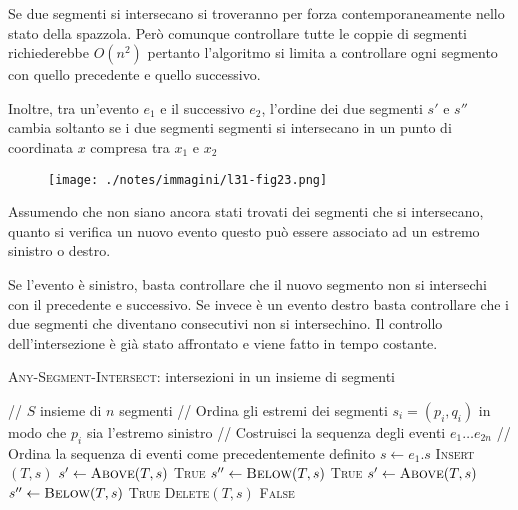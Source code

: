 Se due segmenti si intersecano si troveranno per forza contemporaneamente nello stato della spazzola. 
Però comunque controllare tutte le coppie di segmenti richiederebbe $O(n^{2})$ pertanto l'algoritmo si limita a controllare ogni segmento con quello precedente e quello successivo.

Inoltre, tra un'evento $e_1$ e il successivo $e_2$, l'ordine dei due segmenti $s'$ e $s''$ cambia soltanto se i due segmenti segmenti si intersecano in un punto di coordinata $x$ compresa tra $x_1$ e $x_2$

\begin{figure}[htbp]
	\centering
	\texttt{[image: ./notes/immagini/l31-fig23.png]}
\end{figure}

Assumendo che non siano ancora stati trovati dei segmenti che si intersecano, quanto si verifica un nuovo evento questo può essere associato ad un estremo sinistro o destro.

Se l'evento è sinistro, basta controllare che il nuovo segmento non si intersechi con il precedente e successivo. 
Se invece è un evento destro basta controllare che i due segmenti che diventano consecutivi non si intersechino. 
Il controllo dell'intersezione è già stato affrontato e viene fatto in tempo costante.

\begin{breakablealgorithm}
	\caption{\textsc{Any-Segment-Intersect}: intersezioni in un insieme di segmenti}
	\begin{algorithmic}[1]
		    \State // $S$ insieme di $n$ segmenti
		    \State // Ordina gli estremi dei segmenti $s_i = (p_i,q_i)$ in modo che $p_i$ sia l'estremo sinistro
		    \State // Costruisci la sequenza degli eventi $e_1 \ldots e_{2n}$
		    \State // Ordina la sequenza di eventi come precedentemente definito
		        \State $s \gets e_1.s$
		            \State \textsc{Insert}$(T,s)$
		            \State $s' \gets \textsc{Above}(T,s)$
		                \State \Return \textsc{True}
		            \EndIf
		            \State $s'' \gets \textsc{Below}(T,s)$
		                \State \Return \textsc{True}
		            \EndIf
		        \Else {}
		            \State $s' \gets \textsc{Above}(T,s)$ 
		            \State $s'' \gets \textsc{Below}(T,s)$
		                \State \Return \textsc{True}
		            \EndIf
		            \State \textsc{Delete}$(T,s)$
		        \EndIf
		    \EndFor
		\State \Return \textsc{False}
		\EndFunction

\end{algorithmic}
\end{breakablealgorithm}


